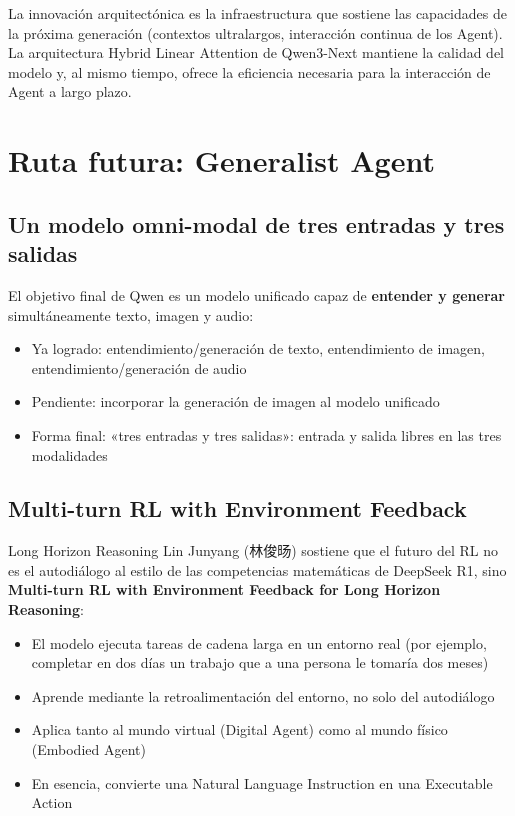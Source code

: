 \documentclass[a4paper]{article}
\begin{document}
La innovación arquitectónica es la infraestructura que sostiene las capacidades de la próxima generación (contextos ultralargos, interacción continua de los Agent). La arquitectura Hybrid Linear Attention de Qwen3-Next mantiene la calidad del modelo y, al mismo tiempo, ofrece la eficiencia necesaria para la interacción de Agent a largo plazo.
\section{Ruta futura: Generalist Agent}

\subsection{Un modelo omni-modal de tres entradas y tres salidas}

El objetivo final de Qwen es un modelo unificado capaz de \textbf{entender y generar} simultáneamente texto, imagen y audio:

\begin{itemize}
    \item Ya logrado: entendimiento/generación de texto, entendimiento de imagen, entendimiento/generación de audio
    \item Pendiente: incorporar la generación de imagen al modelo unificado
    \item Forma final: «tres entradas y tres salidas»: entrada y salida libres en las tres modalidades
\end{itemize}

\subsection{Multi-turn RL with Environment Feedback}

\begin{importantbox}{Long Horizon Reasoning}
Lin Junyang (林俊旸) sostiene que el futuro del RL no es el autodiálogo al estilo de las competencias matemáticas de DeepSeek R1, sino \textbf{Multi-turn RL with Environment Feedback for Long Horizon Reasoning}:
\begin{itemize}
    \item El modelo ejecuta tareas de cadena larga en un entorno real (por ejemplo, completar en dos días un trabajo que a una persona le tomaría dos meses)
    \item Aprende mediante la retroalimentación del entorno, no solo del autodiálogo
    \item Aplica tanto al mundo virtual (Digital Agent) como al mundo físico (Embodied Agent)
    \item En esencia, convierte una Natural Language Instruction en una Executable Action
\end{itemize}
\end{importantbox}
\end{document}
